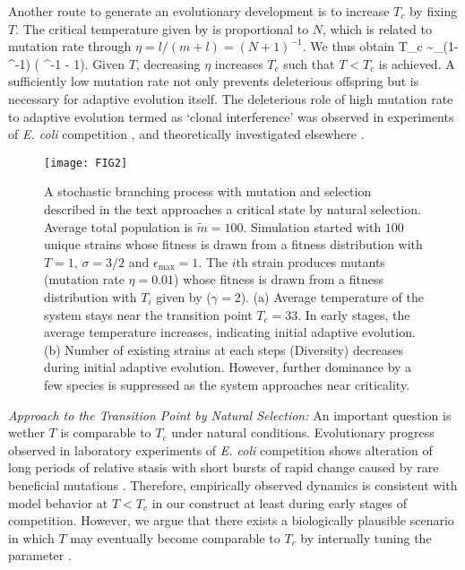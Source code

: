 \documentclass[amsmath,amssymb,floatf
ix]{revtex4}
\begin{document}
Another route to generate an
evolutionary development is to increase $T_c$ by fixing $T$.  The
critical temperature given by  is proportional to $N$, which is related to
mutation rate through $\eta = {l} /(m + l) = (N + 1)^{-1}$.
We thus obtain
\be \label{23} T_c \sim \epsilon_{\max}(1-\sigma^{-1}) ( \eta^{-1} - 1). \en
Given $T$, decreasing $\eta$ increases $T_c$ such that $T<T_c$ is
achieved. A sufficiently low mutation rate not only prevents
deleterious offspring but is necessary for adaptive evolution itself.
The deleterious role of high mutation rate to adaptive evolution termed as
`clonal interference' was observed in experiments of \emph{E. coli}
competition \cite{deVisser99}, and theoretically investigated elsewhere
\cite{Gerrish98}.

\begin{figure}[t]
\texttt{[image: FIG2]}
\caption{\label{SOC}
A stochastic branching process with mutation and selection described
in the text approaches a critical state by natural selection. Average total population is $\tilde{m}=100$. Simulation started with $100$ unique strains whose fitness is drawn from a fitness distribution with $T=1$, $\sigma = 3/2$ and $\epsilon_{\max}=1$. The $i$th strain produces mutants (mutation rate $\eta = 0.01$) whose fitness is drawn from a fitness distribution with $T_i$ given by  ($\gamma = 2$). (a) Average temperature of the system stays near the transition point $T_c = 33$. In early stages, the average temperature increases, indicating initial adaptive evolution.
(b) Number of existing strains at each steps (Diversity) decreases during initial adaptive evolution. However, further dominance by a few species is suppressed as the system approaches near criticality.
}
\end{figure}
\textit{Approach to the Transition Point by Natural Selection:}
An important question is wether $T$ is comparable to
$T_c$ under natural conditions.
Evolutionary progress observed in laboratory
experiments of \emph{E. coli} competition shows alteration of
long periods of relative stasis with short bursts of rapid change caused by
rare beneficial mutations \cite{Elena96}.
Therefore, empirically observed
dynamics is consistent with model behavior at $T < T_c$ in our construct at least during early stages of competition.
However, we argue that there exists a biologically plausible scenario in which
$T$ may eventually become comparable to $T_c$ by internally tuning
the parameter \cite{Bak87,Kauffman91}.
\end{document}
